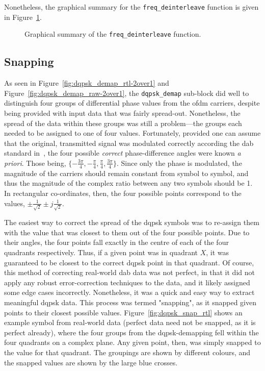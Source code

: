 \documentclass[class=report,11pt,crop=false]{standalone}
\begin{document}
Nonetheless, the graphical summary for the \texttt{freq\_deinterleave} function is given in Figure~\ref{fig:freq_deinterleave}.

\begin{figure}[htbp]
  \centering
  \captionsetup{type=figure}
  \def\svgwidth{\linewidth}
  { %
      }
  \caption{Graphical summary of the \texttt{freq\_deinterleave} function.}
  \label{fig:freq_deinterleave}
\end{figure}

\subsection{ Snapping \label{subsect:dab-proc_dqpsk-snap}}
As seen in Figure~\ref{fig:dqpsk_demap_rtl-2over1} and Figure~\ref{fig:dqpsk_demap_raw-2over1}, the \texttt{dqpsk\_demap} sub-block did well to distinguish four groups of differential phase values from the \gls{ofdm} carriers, despite being provided with input data that was fairly spread-out. Nonetheless, the spread of the data within these groups was still a problem---the groups each needed to be assigned to one of four values. Fortunately, provided one can assume that the original, transmitted signal was modulated correctly according the \gls{dab} standard in~\cite{dabstandard}, the four possible \emph{correct} phase-difference angles were known \emph{a priori}. Those being, \(\{-\frac{3\pi}{4}, -\frac{\pi}{4},\frac{\pi}{4}, \frac{3\pi}{4}\}\). Since only the phase is modulated, the magnitude of the carriers should remain constant from symbol to symbol, and thus the magnitude of the complex ratio between any two symbols should be 1. In rectangular co-ordinates, then, the four possible points correspond to the values, \(\pm \frac{1}{\sqrt{2}} \pm j\frac{1}{\sqrt{2}}\).

The easiest way to correct the spread of the \gls{dqpsk} symbols was to re-assign them with the value that was closest to them out of the four possible points. Due to their angles, the four points fall exactly in the centre of each of the four quadrants respectively. Thus, if a given point was in quadrant \(X\), it was guaranteed to be closest to the correct \gls{dqpsk} point in that quadrant. Of course, this method of correcting real-world \gls{dab} data was not perfect, in that it did not apply any robust error-correction techniques to the data, and it likely assigned some edge cases incorrectly. Nonetheless, it was a quick and easy way to extract meaningful \gls{dqpsk} data. This process was termed "snapping", as it snapped given points to their closest possible values. Figure~\ref{fig:dqpsk_snap_rtl} shows an example symbol from real-world data (perfect data need not be snapped, as it is perfect already), where the four groups from the \gls{dqpsk}-demapping fell within the four quadrants on a complex plane. Any given point, then, was simply snapped to the value for that quadrant. The groupings are shown by different colours, and the snapped values are shown by the large blue crosses.
\end{document}
